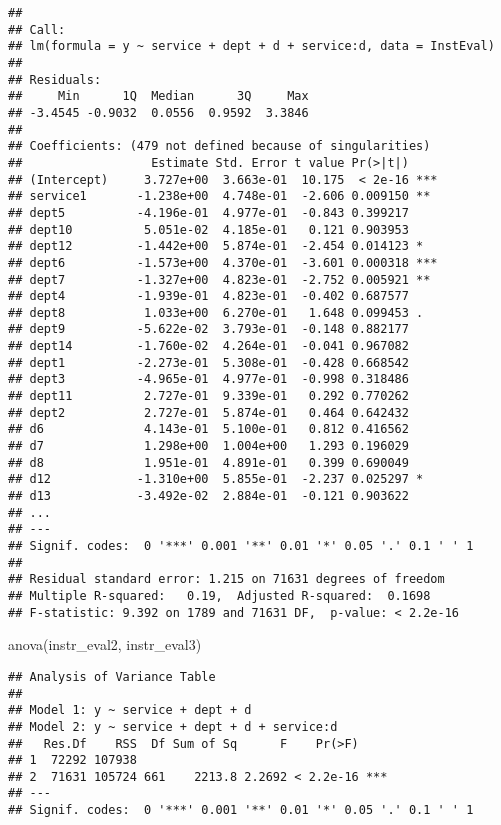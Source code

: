 \documentclass[
]{article}
\newenvironment{Shaded}{\begin{snugshade}}{\end{snugshade}}
\newcommand{\FunctionTok}[1]{\textcolor[rgb]{0.00,0.00,0.00}{#1}}
\newcommand{\NormalTok}[1]{#1}
\begin{document}
\begin{verbatim}
## 
## Call:
## lm(formula = y ~ service + dept + d + service:d, data = InstEval)
## 
## Residuals:
##     Min      1Q  Median      3Q     Max 
## -3.4545 -0.9032  0.0556  0.9592  3.3846 
## 
## Coefficients: (479 not defined because of singularities)
##                  Estimate Std. Error t value Pr(>|t|)    
## (Intercept)     3.727e+00  3.663e-01  10.175  < 2e-16 ***
## service1       -1.238e+00  4.748e-01  -2.606 0.009150 ** 
## dept5          -4.196e-01  4.977e-01  -0.843 0.399217    
## dept10          5.051e-02  4.185e-01   0.121 0.903953    
## dept12         -1.442e+00  5.874e-01  -2.454 0.014123 *  
## dept6          -1.573e+00  4.370e-01  -3.601 0.000318 ***
## dept7          -1.327e+00  4.823e-01  -2.752 0.005921 ** 
## dept4          -1.939e-01  4.823e-01  -0.402 0.687577    
## dept8           1.033e+00  6.270e-01   1.648 0.099453 .  
## dept9          -5.622e-02  3.793e-01  -0.148 0.882177    
## dept14         -1.760e-02  4.264e-01  -0.041 0.967082    
## dept1          -2.273e-01  5.308e-01  -0.428 0.668542    
## dept3          -4.965e-01  4.977e-01  -0.998 0.318486    
## dept11          2.727e-01  9.339e-01   0.292 0.770262    
## dept2           2.727e-01  5.874e-01   0.464 0.642432    
## d6              4.143e-01  5.100e-01   0.812 0.416562    
## d7              1.298e+00  1.004e+00   1.293 0.196029    
## d8              1.951e-01  4.891e-01   0.399 0.690049    
## d12            -1.310e+00  5.855e-01  -2.237 0.025297 *  
## d13            -3.492e-02  2.884e-01  -0.121 0.903622    
## ...
## ---
## Signif. codes:  0 '***' 0.001 '**' 0.01 '*' 0.05 '.' 0.1 ' ' 1
## 
## Residual standard error: 1.215 on 71631 degrees of freedom
## Multiple R-squared:   0.19,  Adjusted R-squared:  0.1698 
## F-statistic: 9.392 on 1789 and 71631 DF,  p-value: < 2.2e-16
\end{verbatim}

\begin{Shaded}
\begin{Highlighting}[]
\FunctionTok{anova}\NormalTok{(instr\_eval2, instr\_eval3)}
\end{Highlighting}
\end{Shaded}

\begin{verbatim}
## Analysis of Variance Table
## 
## Model 1: y ~ service + dept + d
## Model 2: y ~ service + dept + d + service:d
##   Res.Df    RSS  Df Sum of Sq      F    Pr(>F)    
## 1  72292 107938                                   
## 2  71631 105724 661    2213.8 2.2692 < 2.2e-16 ***
## ---
## Signif. codes:  0 '***' 0.001 '**' 0.01 '*' 0.05 '.' 0.1 ' ' 1
\end{verbatim}
\end{document}
